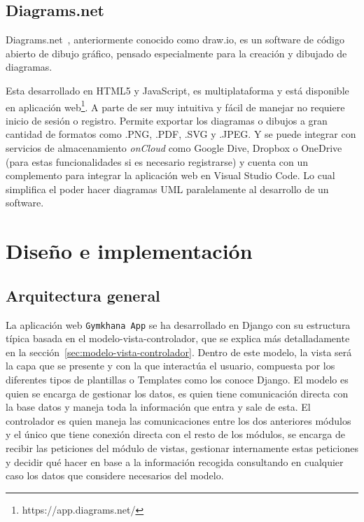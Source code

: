 \documentclass[a4paper, 12pt]{book}
\begin{document}
\section{Diagrams.net}
Diagrams.net~\cite{diagrams.net}, anteriormente conocido como draw.io, es un software de código abierto de dibujo gráfico, pensado especialmente para la creación y dibujado de diagramas.

Esta desarrollado en HTML5 y JavaScript, es multiplataforma y está disponible en aplicación web\footnote{https://app.diagrams.net/}. A parte de ser muy intuitiva y fácil de manejar no requiere inicio de sesión o registro. Permite exportar los diagramas o dibujos a gran cantidad de formatos como .PNG, .PDF, .SVG y .JPEG. Y se puede integrar con servicios de almacenamiento \emph{onCloud} como Google Dive, Dropbox o OneDrive (para estas funcionalidades si es necesario registrarse) y cuenta con un complemento para integrar la aplicación web en Visual Studio Code. Lo cual simplifica el poder hacer diagramas UML paralelamente al desarrollo de un software.



\chapter{Diseño e implementación}
\label{chap:diseño}


\section{Arquitectura general} 
\label{sec:arquitectura}

La aplicación web \texttt{Gymkhana App} se ha desarrollado en Django con su estructura típica basada en el modelo-vista-controlador, que se explica más detalladamente en la sección~\ref{sec:modelo-vista-controlador}. Dentro de este modelo, la vista será la capa que se presente y con la que interactúa el usuario, compuesta por los diferentes tipos de plantillas o Templates como los conoce Django. El modelo es quien se encarga de gestionar los datos, es quien tiene comunicación directa con la base datos y maneja toda la información que entra y sale de esta. El controlador es quien maneja las comunicaciones entre los dos anteriores módulos y el único que tiene conexión directa con el resto de los módulos, se encarga de recibir las peticiones del módulo de vistas, gestionar internamente estas peticiones y decidir qué hacer en base a la información recogida consultando en cualquier caso los datos que considere necesarios del modelo. 
\end{document}
